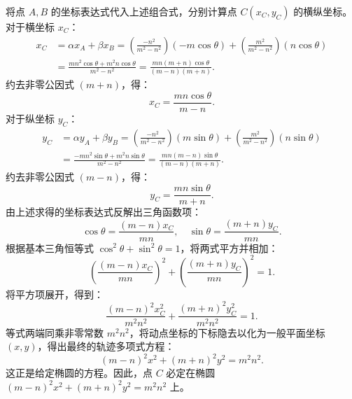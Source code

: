 \begin{solution}
将点 $A, B$ 的坐标表达式代入上述组合式，分别计算点 $C(x_C, y_C)$ 的横纵坐标。
对于横坐标 $x_C$：
\begin{align*}
x_C &= \alpha x_A + \beta x_B = \left(\frac{-n^2}{m^2 - n^2}\right)(-m\cos\theta) + \left(\frac{m^2}{m^2 - n^2}\right)(n\cos\theta) \\
&= \frac{mn^2\cos\theta + m^2n\cos\theta}{m^2 - n^2} = \frac{mn(m+n)\cos\theta}{(m-n)(m+n)}.
\end{align*}
约去非零公因式 $(m+n)$，得：
\[ x_C = \frac{mn\cos\theta}{m-n}. \]
对于纵坐标 $y_C$：
\begin{align*}
y_C &= \alpha y_A + \beta y_B = \left(\frac{-n^2}{m^2 - n^2}\right)(m\sin\theta) + \left(\frac{m^2}{m^2 - n^2}\right)(n\sin\theta) \\
&= \frac{-mn^2\sin\theta + m^2n\sin\theta}{m^2 - n^2} = \frac{mn(m-n)\sin\theta}{(m-n)(m+n)}.
\end{align*}
约去非零公因式 $(m-n)$，得：
\[ y_C = \frac{mn\sin\theta}{m+n}. \]
由上述求得的坐标表达式反解出三角函数项：
\[ \cos\theta = \frac{(m-n)x_C}{mn}, \quad \sin\theta = \frac{(m+n)y_C}{mn}. \]
根据基本三角恒等式 $\cos^2\theta + \sin^2\theta = 1$，将两式平方并相加：
\[ \left( \frac{(m-n)x_C}{mn} \right)^2 + \left( \frac{(m+n)y_C}{mn} \right)^2 = 1. \]
将平方项展开，得到：
\[ \frac{(m-n)^2 x_C^2}{m^2 n^2} + \frac{(m+n)^2 y_C^2}{m^2 n^2} = 1. \]
等式两端同乘非零常数 $m^2 n^2$，将动点坐标的下标隐去以化为一般平面坐标 $(x, y)$，得出最终的轨迹多项式方程：
\[ (m-n)^2 x^2 + (m+n)^2 y^2 = m^2 n^2. \]
这正是给定椭圆的方程。因此，点 $C$ 必定在椭圆 $(m-n)^2x^2 + (m+n)^2y^2 = m^2n^2$ 上。
\end{solution}



